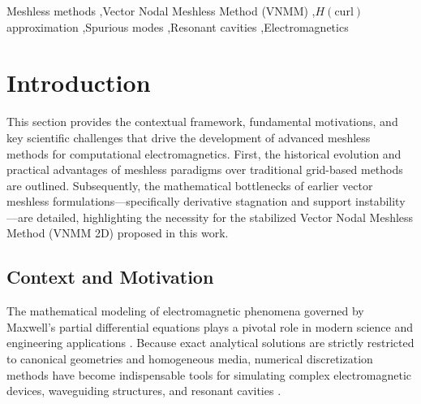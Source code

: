 \documentclass[preprint,12pt]{elsarticle}
\begin{document}
\begin{frontmatter}
\begin{keyword}
Meshless methods \sep Vector Nodal Meshless Method (VNMM) \sep $H(\mathrm{curl})$ approximation \sep Spurious modes \sep Resonant cavities \sep Electromagnetics


\end{keyword}

\end{frontmatter}


\section{Introduction}
\label{sec:intro}

This section provides the contextual framework, fundamental motivations, and key scientific challenges that drive the development of advanced meshless methods for computational electromagnetics. First, the historical evolution and practical advantages of meshless paradigms over traditional grid-based methods are outlined. Subsequently, the mathematical bottlenecks of earlier vector meshless formulations---specifically derivative stagnation and support instability---are detailed, highlighting the necessity for the stabilized Vector Nodal Meshless Method (VNMM 2D) proposed in this work.

\subsection{Context and Motivation}
\label{subsec:context_motivation}

The mathematical modeling of electromagnetic phenomena governed by Maxwell's partial differential equations plays a pivotal role in modern science and engineering applications \cite{jin2014finite, harrington2001time}. Because exact analytical solutions are strictly restricted to canonical geometries and homogeneous media, numerical discretization methods have become indispensable tools for simulating complex electromagnetic devices, waveguiding structures, and resonant cavities \cite{jin2014finite, monk2003finite}.
\end{document}
